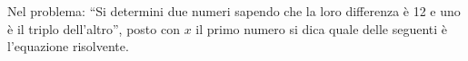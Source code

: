 Nel problema: 
``{Si determini due numeri sapendo che la loro differenza è 12 
e uno è il triplo dell'altro}'', 
posto con $x$ il primo numero si dica quale delle seguenti è 
l'equazione risolvente.